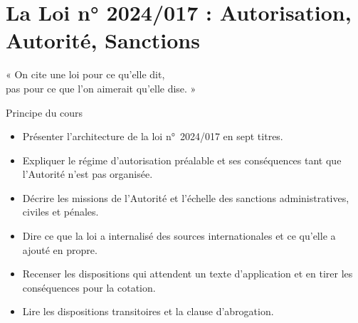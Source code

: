 
\chapter{La Loi n° 2024/017 : Autorisation, Autorité, Sanctions}
\label{chap:loi}

\epigraph{%
    « On cite une loi pour ce qu'elle dit,\\
    pas pour ce que l'on aimerait qu'elle dise. »%
}{Principe du cours}


\begin{boxobjectifs}
\begin{itemize}
    \item Présenter l'architecture de la loi n°~2024/017 en sept titres.
    \item Expliquer le régime d'autorisation préalable et ses conséquences
          tant que l'Autorité n'est pas organisée.
    \item Décrire les missions de l'Autorité et l'échelle des sanctions
          administratives, civiles et pénales.
    \item Dire ce que la loi a internalisé des sources internationales et
          ce qu'elle a ajouté en propre.
    \item Recenser les dispositions qui attendent un texte d'application et
          en tirer les conséquences pour la cotation.
    \item Lire les dispositions transitoires et la clause d'abrogation.
\end{itemize}
\end{boxobjectifs}

